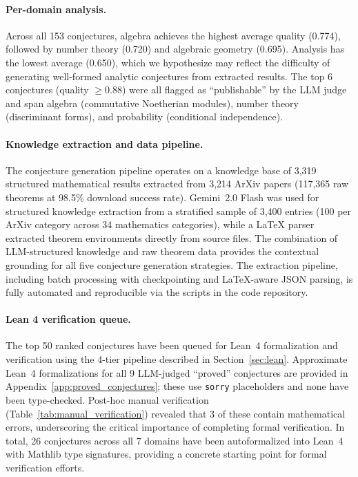 \documentclass[11pt,a4paper]{article}
\begin{document}
\paragraph{Per-domain analysis.}
Across all 153 conjectures, algebra achieves the highest average quality (0.774), followed by number theory (0.720) and algebraic geometry (0.695). Analysis has the lowest average (0.650), which we hypothesize may reflect the difficulty of generating well-formed analytic conjectures from extracted results. The top 6 conjectures (quality $\geq 0.88$) were all flagged as ``publishable'' by the LLM judge and span algebra (commutative Noetherian modules), number theory (discriminant forms), and probability (conditional independence).

\paragraph{Knowledge extraction and data pipeline.}
The conjecture generation pipeline operates on a knowledge base of 3,319 structured mathematical results extracted from 3,214 ArXiv papers (117,365 raw theorems at 98.5\% download success rate). Gemini~2.0 Flash was used for structured knowledge extraction from a stratified sample of 3,400 entries (100 per ArXiv category across 34 mathematics categories), while a LaTeX parser extracted theorem environments directly from source files. The combination of LLM-structured knowledge and raw theorem data provides the contextual grounding for all five conjecture generation strategies. The extraction pipeline, including batch processing with checkpointing and LaTeX-aware JSON parsing, is fully automated and reproducible via the scripts in the code repository.

\paragraph{Lean 4 verification queue.}
The top 50 ranked conjectures have been queued for Lean~4 formalization and verification using the 4-tier pipeline described in Section~\ref{sec:lean}. Approximate Lean~4 formalizations for all 9 LLM-judged ``proved'' conjectures are provided in Appendix~\ref{app:proved_conjectures}; these use \texttt{sorry} placeholders and none have been type-checked. Post-hoc manual verification (Table~\ref{tab:manual_verification}) revealed that 3 of these contain mathematical errors, underscoring the critical importance of completing formal verification. In total, 26 conjectures across all 7 domains have been autoformalized into Lean~4 with Mathlib type signatures, providing a concrete starting point for formal verification efforts.
\end{document}
